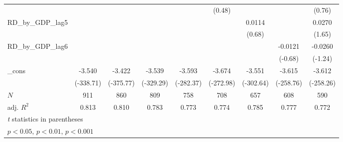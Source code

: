 {\begin{tabular}{l*{8}{c}}
          &                  &                  &                  &                  &   (0.48)         &                  &                  &   (0.76)         \\
\addlinespace
RD\_by\_GDP\_lag5&                  &                  &                  &                  &                  &   0.0114         &                  &   0.0270         \\
          &                  &                  &                  &                  &                  &   (0.68)         &                  &   (1.65)         \\
\addlinespace
RD\_by\_GDP\_lag6&                  &                  &                  &                  &                  &                  &  -0.0121         &  -0.0260         \\
          &                  &                  &                  &                  &                  &                  &  (-0.68)         &  (-1.24)         \\
\addlinespace
\_cons    &   -3.540\sym{***}&   -3.422\sym{***}&   -3.539\sym{***}&   -3.593\sym{***}&   -3.674\sym{***}&   -3.551\sym{***}&   -3.615\sym{***}&   -3.612\sym{***}\\
          &(-338.71)         &(-375.77)         &(-329.29)         &(-282.37)         &(-272.98)         &(-302.64)         &(-258.76)         &(-258.26)         \\
\midrule
\(N\)     &      911         &      860         &      809         &      758         &      708         &      657         &      608         &      590         \\
adj. \(R^{2}\)&    0.813         &    0.810         &    0.783         &    0.773         &    0.774         &    0.785         &    0.777         &    0.772         \\
\bottomrule
\multicolumn{9}{l}{\footnotesize \textit{t} statistics in parentheses}\\
\multicolumn{9}{l}{\footnotesize \sym{*} \(p<0.05\), \sym{**} \(p<0.01\), \sym{***} \(p<0.001\)}\\
\end{tabular}
}
